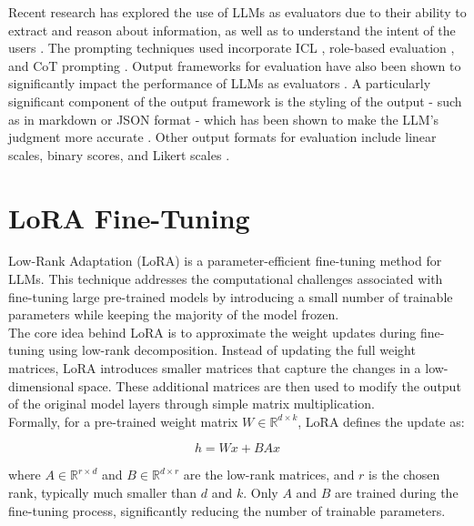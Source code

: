 Recent research has explored the use of LLMs as evaluators due to their ability to extract and reason about information, as well as to understand the intent of the users \cite{schulhoff2024promptreportsystematicsurvey}. The prompting techniques used incorporate ICL \cite{kocmi2023gemba}, role-based evaluation \cite{wu2023large}, and CoT prompting \cite{lu2023error}. Output frameworks for evaluation have also been shown to significantly impact the performance of LLMs as evaluators \cite{gao2023human}. A particularly significant component of the output framework is the styling of the output - such as in markdown or JSON format - which has been shown to make the LLM's judgment more accurate \cite{hada2023large, lin2023llm}. Other output formats for evaluation include linear scales, binary scores, and Likert scales \cite{schulhoff2024promptreportsystematicsurvey}.

\section{LoRA Fine-Tuning}



Low-Rank Adaptation (LoRA) \cite{hu2021loralowrankadaptationlarge} is a parameter-efficient fine-tuning method for LLMs. This technique addresses the computational challenges associated with fine-tuning large pre-trained models by introducing a small number of trainable parameters while keeping the majority of the model frozen.\\

The core idea behind LoRA is to approximate the weight updates during fine-tuning using low-rank decomposition. Instead of updating the full weight matrices, LoRA introduces smaller matrices that capture the changes in a low-dimensional space. These additional matrices are then used to modify the output of the original model layers through simple matrix multiplication.\\

Formally, for a pre-trained weight matrix $W \in \mathbb{R}^{d \times k}$, LoRA defines the update as:

\[
h = Wx + BAx
\]

where $A \in \mathbb{R}^{r \times d}$ and $B \in \mathbb{R}^{d \times r}$ are the low-rank matrices, and $r$ is the chosen rank, typically much smaller than $d$ and $k$. Only $A$ and $B$ are trained during the fine-tuning process, significantly reducing the number of trainable parameters.\\

